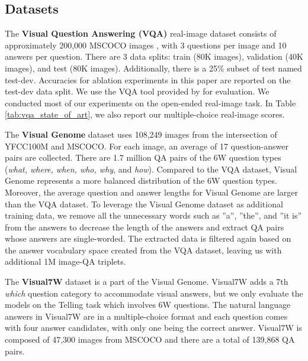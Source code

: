 \documentclass[11pt,letterpaper]{article}
\begin{document}
\subsection{Datasets}
The \textbf{Visual Question Answering (VQA)} real-image dataset \cite{antol2015vqa} consists of approximately 200,000 MSCOCO images \cite{lin2014microsoft}, with 3 questions per image and 10 answers per question. There are 3 data splits: train (80K images), validation (40K images), and test (80K images). Additionally, there is a 25\% subset of test named test-dev. Accuracies for ablation experiments in this paper are reported on the test-dev data split. We use the VQA tool provided by  for evaluation. We conducted most of our experiments on the open-ended real-image task. In Table \ref{tab:vqa_state_of_art}, we also report our multiple-choice real-image scores.

The \textbf{Visual Genome} dataset \cite{krishna16arxiv} uses 108,249 images from the intersection of YFCC100M \cite{DBLP:journals/corr/ThomeeSFENPBL15} and MSCOCO. For each image, an average of 17 question-answer pairs are collected. There are 1.7 million QA pairs of the 6W question types (\textit{what, where, when, who, why}, and \textit{how}).
Compared to the VQA dataset, Visual Genome represents a more balanced distribution of the 6W question types. Moreover, the average question and answer lengths for Visual Genome are larger than the VQA dataset. To leverage the Visual Genome dataset as additional training data, we remove all the unnecessary words such as ''a'', ''the'', and ''it is'' from the answers to decrease the length of the answers and extract QA pairs whose answers are single-worded. The extracted data is filtered again based on the answer vocabulary space created from the VQA dataset, leaving us with additional 1M image-QA triplets.

The \textbf{Visual7W} dataset \cite{zhu16cvpr} is a part of the Visual Genome. Visual7W adds a 7th \textit{which} question category to accommodate visual answers, but we only evaluate the models on the Telling task which involves 6W questions. The natural language answers in Visual7W are in a multiple-choice format and each question comes with four answer candidates, with only one being the correct answer. Visual7W is composed of 47,300 images from MSCOCO and there are a total of 139,868 QA pairs. 
\end{document}
